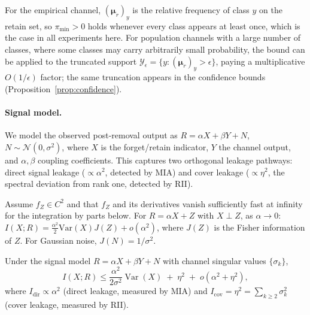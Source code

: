 \documentclass[smallextended]{svjour3}       %
\begin{document}
\begin{remark}[On $\pi_{\min}>0$]
\label{rem:pi_min}
For the empirical channel, $(\boldsymbol{\mu}_r)_y$ is the relative frequency of class $y$ on the retain set, so $\pi_{\min}>0$ holds whenever every class appears at least once, which is the case in all experiments here. For population channels with a large number of classes, where some classes may carry arbitrarily small probability, the bound can be applied to the truncated support $\mathcal{Y}_\epsilon=\{y:(\boldsymbol{\mu}_r)_y>\epsilon\}$, paying a multiplicative $O(1/\epsilon)$ factor; the same truncation appears in the confidence bounds (Proposition~\ref{prop:confidence}).
\end{remark}

\paragraph{Signal model.}
We model the observed post-removal output as $R = \alpha X + \beta Y + N$, $N \sim \mathcal{N}(0,\sigma^2)$, where $X$ is the forget/retain indicator, $Y$ the channel output, and $\alpha,\beta$ coupling coefficients. This captures two orthogonal leakage pathways: direct signal leakage ($\propto \alpha^2$, detected by MIA) and cover leakage ($\propto \eta^2$, the spectral deviation from rank one, detected by RII).

\begin{lemma}
\label{lem:fisher}
Assume $f_Z\in C^2$ and that $f_Z$ and its derivatives vanish sufficiently fast at infinity for the integration by parts below. For $R = \alpha X + Z$ with $X \perp Z$, as $\alpha \to 0$:
$I(X;R) = \frac{\alpha^2}{2}\mathrm{Var}(X)J(Z) + o(\alpha^2)$, where $J(Z)$ is the Fisher information of $Z$. For Gaussian noise, $J(N) = 1/\sigma^2$.
\end{lemma}

\begin{theorem}
\label{thm:unified}
Under the signal model $R = \alpha X + \beta Y + N$ with channel singular values $\{\sigma_k\}$,
\begin{equation}
I(X; R) \le \frac{\alpha^2}{2\sigma^2}\operatorname{Var}(X) \;+\; \eta^2 \;+\; o(\alpha^2 + \eta^2),
\end{equation}
where $I_{\mathrm{dir}} \propto \alpha^2$ (direct leakage, measured by MIA) and $I_{\mathrm{cov}} = \eta^2 = \sum_{k\ge 2}\sigma_k^2$ (cover leakage, measured by RII).
\end{theorem}
\end{document}
